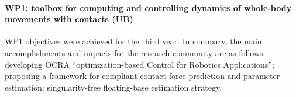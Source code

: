 

\paragraph*{WP1: toolbox for computing and controlling dynamics of whole-body
  movements with contacts (UB)}

WP1 objectives were achieved for the third year.  In summary, the main
accomplishments and impacts for the research community are as follows:
developing OCRA ``optimization-based Control for Robotics Applications'';
proposing a framework for compliant contact force prediction and parameter estimation;
singularity-free floating-base estimation strategy.

